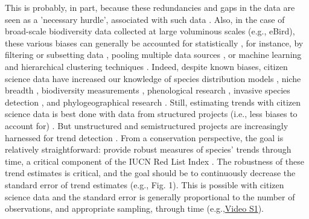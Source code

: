 \documentclass[9pt,twocolumn,twoside,lineno]{pnas-new}
\begin{document}
This is probably, in part, because these redundancies and gaps in the data are seen as a 'necessary hurdle', associated with such data \cite{parrish2018exposing}. Also, in the case of broad-scale biodiversity data collected at large voluminous scales (e.g., eBird), these various biases can generally be accounted for statistically \cite{isaac2014statistics, robinson2018correcting}, for instance, by filtering or subsetting data \cite{wiggins2011conservation}, pooling multiple data sources \cite{fithian2015bias}, or machine learning and hierarchical clustering techniques \cite{hochachka2012data, kelling2015taking}. Indeed, despite known biases, citizen science data have increased our knowledge of species distribution models \cite{bradsworth2017species, van2013opportunistic}, niche breadth \cite{tiago2017using}, biodiversity measurements \cite{stuart2017assessing, pocock2018vision}, phenological research \cite{la2014role, supp2015citizen}, invasive species detection \cite{pocock2017citizen, grason2018citizen}, and phylogeographical research \cite{bahls2014new, drury2019continent}. Still, estimating trends with citizen science data is best done with data from structured projects (i.e., less biases to account for) \cite{fox2011new}. But unstructured and semistructured projects are increasingly harnessed for trend detection \cite{walker2017using, kery2009trend, kery2010site, horns2018using, van2013occupancy, pagel2014quantifying}. From a conservation perspective, the goal is relatively straightforward: provide robust measures of species' trends through time, a critical component of the IUCN Red List Index \cite{baillie2008toward}. The robustness of these trend estimates is critical, and the goal should be to continuously decrease the standard error of trend estimates (e.g., Fig. 1). This is possible with citizen science data \cite{kery2010site, horns2018using, van2013occupancy, pagel2014quantifying} and the standard error is generally proportional to the number of observations, and appropriate sampling, through time (e.g.,\href{https://github.com/coreytcallaghan/optimize_citizen_science_obs/blob/master/Figures/Noisy_miner_gif.gif}{Video S1}).
\end{document}
